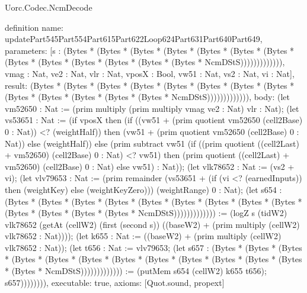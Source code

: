 \begin{lexlean}{Uorc.Codec.NcmDecode}
\begin{semanticmodule}
definition{
  name: updatePart545Part554Part615Part622Loop624Part631Part640Part649,
  parameters: [s : (Bytes * (Bytes * (Bytes * (Bytes * (Bytes * (Bytes * (Bytes * (Bytes * (Bytes * (Bytes * (Bytes * (Bytes * (Bytes * NcmDStS))))))))))))), vmag : Nat, ve2 : Nat, vlr : Nat, vposX : Bool, vw51 : Nat, vs2 : Nat, vi : Nat],
  result: (Bytes * (Bytes * (Bytes * (Bytes * (Bytes * (Bytes * (Bytes * (Bytes * (Bytes * (Bytes * (Bytes * (Bytes * (Bytes * NcmDStS))))))))))))),
  body: (let vm52650 : Nat := (prim multiply (prim multiply vmag ve2 : Nat) vlr : Nat); (let vs53651 : Nat := (if vposX then (if ((vw51 + (prim quotient vm52650 (cell2Base) 0 : Nat)) <? (weightHalf)) then (vw51 + (prim quotient vm52650 (cell2Base) 0 : Nat)) else (weightHalf)) else (prim subtract vw51 (if ((prim quotient ((cell2Last) + vm52650) (cell2Base) 0 : Nat) <? vw51) then (prim quotient ((cell2Last) + vm52650) (cell2Base) 0 : Nat) else vw51) : Nat)); (let vlk78652 : Nat := (vs2 + vi); (let vlv79653 : Nat := (prim remainder (vs53651 + (if (vi <? (earnedInputs)) then (weightKey) else (weightKeyZero))) (weightRange) 0 : Nat); (let s654 : (Bytes * (Bytes * (Bytes * (Bytes * (Bytes * (Bytes * (Bytes * (Bytes * (Bytes * (Bytes * (Bytes * (Bytes * (Bytes * NcmDStS))))))))))))) := (logZ s (tidW2) vlk78652 (getAt (cellW2) (first (second s)) ((baseW2) + (prim multiply (cellW2) vlk78652 : Nat)))); (let k655 : Nat := ((baseW2) + (prim multiply (cellW2) vlk78652 : Nat)); (let t656 : Nat := vlv79653; (let s657 : (Bytes * (Bytes * (Bytes * (Bytes * (Bytes * (Bytes * (Bytes * (Bytes * (Bytes * (Bytes * (Bytes * (Bytes * (Bytes * NcmDStS))))))))))))) := (putMem s654 (cellW2) k655 t656); s657)))))))),
  executable: true,
  axioms: [Quot.sound, propext]
}


\end{semanticmodule}
\end{lexlean}
